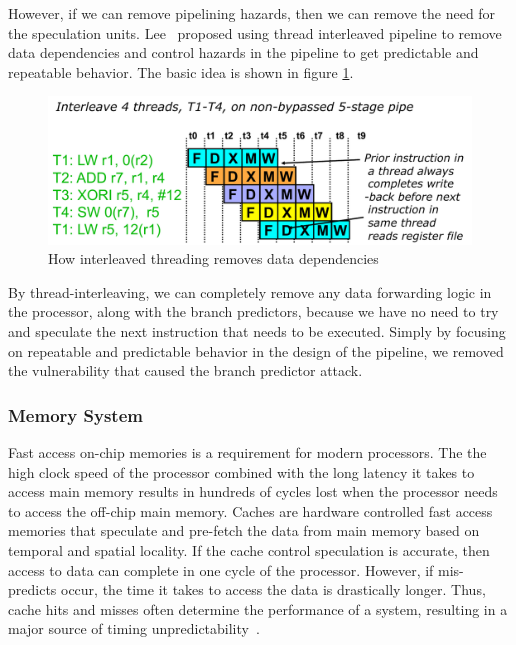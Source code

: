 \documentclass[times, 10pt,twocolumn]{article}
\begin{document}
However, if we can remove pipelining hazards, then we can remove the need for the speculation units. Lee~\cite{lee1987pipeline1} proposed using thread interleaved pipeline to remove data dependencies and control hazards in the pipeline to get predictable and repeatable behavior. The basic idea is shown in figure \ref{fig:int_pipe}. 
\begin{figure}[ht]
  \centering
  \includegraphics[scale=.35]{./images/interleavedpipeline.pdf}
  \caption{How interleaved threading removes data dependencies}
  \label{fig:int_pipe}
\end{figure}

By thread-interleaving, we can completely remove any data forwarding logic in the processor, along with the branch predictors, because we have no need to try and speculate the next instruction that needs to be executed. Simply by focusing on repeatable and predictable behavior in the design of the pipeline, we removed the vulnerability that caused the branch predictor attack. 

\subsubsection {Memory System}
Fast access on-chip memories is a requirement for modern processors. The the high clock speed of the processor combined with the long latency it takes to access main memory results in hundreds of cycles lost when the processor needs to access the off-chip main memory. Caches are hardware controlled fast access memories that speculate and pre-fetch the data from main memory based on temporal and spatial locality. If the cache control speculation is accurate, then access to data can complete in one cycle of the processor. However, if mis-predicts occur, the time it takes to access the data is drastically longer. Thus, cache hits and misses often determine the performance of a system, resulting in a major source of timing unpredictability~\cite{thiele:04:predictable}.
\end{document}

